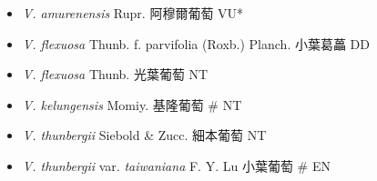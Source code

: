 \begin{itemize}
  \begin{itemize}
        \item[] \textit{V. amurenensis} Rupr.  阿穆爾葡萄   VU*
        \item[] \textit{V. flexuosa} Thunb. f. parvifolia (Roxb.) Planch.  小葉葛藟   DD
        \item[] \textit{V. flexuosa} Thunb.  光葉葡萄   NT
        \item[] \textit{V. kelungensis} Momiy.  基隆葡萄  \# NT
        \item[] \textit{V. thunbergii} Siebold \& Zucc.  細本葡萄   NT
        \item[] \textit{V. thunbergii} var. \textit{taiwaniana} F. Y. Lu  小葉葡萄  \# EN
  \end{itemize}
  \end{itemize}
